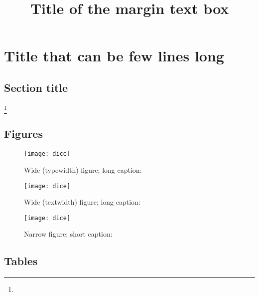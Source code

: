 \documentclass{enisareport}
\theoremstyle{plain}
\theoremstyle{definition}
\begin{document}
\lipsum[3][1-4]


\chapter{Title that can be few lines long}\label{chap2}

\section{Section title}\label{sec21}



{%
  \title{Title of the margin text box}
  \lipsum[2][1-3]
}

\lipsum[1]\footnote{\lipsum[1][2]} \lipsum[2-4]

\clearpage

\section{Figures}

\lipsum[1]
%
%
\begin{figure*}
  \caption{Wide (typewidth) figure; long caption: \lipsum[4]}
  \texttt{[image: dice]}
\end{figure*}
%
%
\begin{figure}
  \caption{Wide (textwidth) figure; long caption: \lipsum[4][1]}
  \texttt{[image: dice]}
\end{figure}
%
%
\begin{figure}
  \caption{Narrow figure; short caption: \lipsum[4][1]}
  \texttt{[image: dice]}
\end{figure}

\clearpage

\section{Tables}%
\label{sec:tabs}
\end{document}
